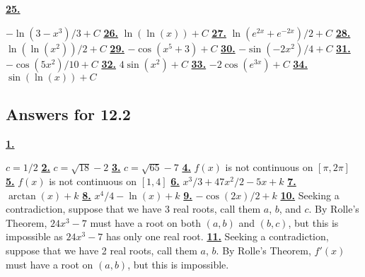 \hypertarget {a:12.1.25}{\hyperlink {e:12.1.25}{\bfseries 25.}} \mdseries $-\ln (3-x^3)/3+C$\qquad 
\hypertarget {a:12.1.26}{\hyperlink {e:12.1.26}{\bfseries 26.}} \mdseries $\ln (\ln (x))+C$\qquad 
\hypertarget {a:12.1.27}{\hyperlink {e:12.1.27}{\bfseries 27.}} \mdseries $\ln (e^{2x}+e^{-2x})/2 +C$\qquad 
\hypertarget {a:12.1.28}{\hyperlink {e:12.1.28}{\bfseries 28.}} \mdseries $\ln (\ln (x^2))/2 + C$\qquad 
\hypertarget {a:12.1.29}{\hyperlink {e:12.1.29}{\bfseries 29.}} \mdseries $-\cos (x^5+3) +C$\qquad 
\hypertarget {a:12.1.30}{\hyperlink {e:12.1.30}{\bfseries 30.}} \mdseries $-\sin (-2x^2)/4 +C$\qquad 
\hypertarget {a:12.1.31}{\hyperlink {e:12.1.31}{\bfseries 31.}} \mdseries $-\cos (5x^2)/10 +C$\qquad 
\hypertarget {a:12.1.32}{\hyperlink {e:12.1.32}{\bfseries 32.}} \mdseries $4\sin (x^2)+C$\qquad 
\hypertarget {a:12.1.33}{\hyperlink {e:12.1.33}{\bfseries 33.}} \mdseries $-2\cos (e^{3x})+C$\qquad 
\hypertarget {a:12.1.34}{\hyperlink {e:12.1.34}{\bfseries 34.}} \mdseries $\sin (\ln (x)) + C$\qquad 
\subsection *{Answers for 12.2}
\hypertarget {a:12.2.1}{\hyperlink {e:12.2.1}{\bfseries 1.}} \mdseries $c=1/2$\qquad 
\hypertarget {a:12.2.2}{\hyperlink {e:12.2.2}{\bfseries 2.}} \mdseries $c=\sqrt {18}-2$\qquad 
\hypertarget {a:12.2.3}{\hyperlink {e:12.2.3}{\bfseries 3.}} \mdseries $c=\sqrt {65}-7$\qquad 
\hypertarget {a:12.2.4}{\hyperlink {e:12.2.4}{\bfseries 4.}} \mdseries $f(x)$ is not continuous on $[\pi ,2\pi ]$\qquad 
\hypertarget {a:12.2.5}{\hyperlink {e:12.2.5}{\bfseries 5.}} \mdseries $f(x)$ is not continuous on $[1,4]$\qquad 
\hypertarget {a:12.2.6}{\hyperlink {e:12.2.6}{\bfseries 6.}} \mdseries $x^3/3+47x^2/2-5x+k$\qquad 
\hypertarget {a:12.2.7}{\hyperlink {e:12.2.7}{\bfseries 7.}} \mdseries $\arctan (x) + k$\qquad 
\hypertarget {a:12.2.8}{\hyperlink {e:12.2.8}{\bfseries 8.}} \mdseries $x^4/4 -\ln (x) +k$\qquad 
\hypertarget {a:12.2.9}{\hyperlink {e:12.2.9}{\bfseries 9.}} \mdseries $-\cos (2x)/2 +k$\qquad 
\hypertarget {a:12.2.10}{\hyperlink {e:12.2.10}{\bfseries 10.}} \mdseries Seeking a contradiction, suppose that we have 3 real roots, call them $a$, $b$, and $c$. By Rolle's Theorem, $24x^3-7$ must have a root on both $(a,b)$ and $(b,c)$, but this is impossible as $24x^3-7$ has only one real root.\qquad 
\hypertarget {a:12.2.11}{\hyperlink {e:12.2.11}{\bfseries 11.}} \mdseries Seeking a contradiction, suppose that we have 2 real roots, call them $a$, $b$. By Rolle's Theorem, $f'(x)$ must have a root on $(a,b)$, but this is impossible.\qquad 
